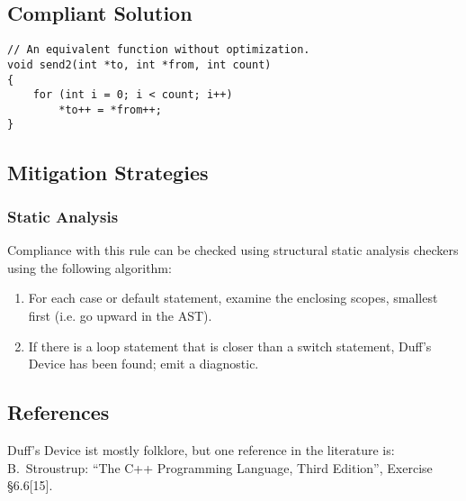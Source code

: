 \subsection{Compliant Solution}

\begin{verbatim}
// An equivalent function without optimization.
void send2(int *to, int *from, int count)
{
    for (int i = 0; i < count; i++)
        *to++ = *from++;
}
\end{verbatim}

\subsection{Mitigation Strategies}
\subsubsection{Static Analysis} 

Compliance with this rule can be checked using structural static analysis checkers using the following algorithm:

\begin{enumerate}
\item For each case or default statement, examine the enclosing scopes,
smallest first (i.e. go upward in the AST).
\item If there is a loop statement that is closer than a switch statement,
Duff's Device has been found; emit a diagnostic.
\end{enumerate}

\subsection{References}

Duff's Device ist mostly folklore, but one reference in the literature is:
B.~Stroustrup: ``The C++ Programming Language, Third Edition'', Exercise
\S6.6[15].
